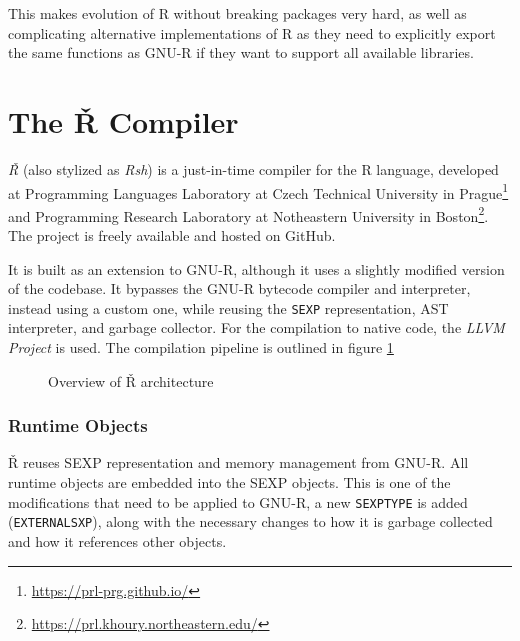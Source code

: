 This makes evolution of R without breaking packages very hard, as well as complicating alternative implementations of R as they need to explicitly export the same functions as GNU-R if they want to support all available libraries.

\newpage
\section{The Ř Compiler}

\textit{Ř} (also stylized as \textit{Rsh}) is a just-in-time compiler for the R language, developed at Programming Languages Laboratory at Czech Technical University in Prague\footnote{\url{https://prl-prg.github.io/}} and Programming Research Laboratory at Notheastern University in Boston\footnote{\url{https://prl.khoury.northeastern.edu/}}. The project is freely available and hosted on GitHub\cite{rsh-github}.

It is built as an extension to GNU-R, although it uses a slightly modified version of the codebase. It bypasses the GNU-R bytecode compiler and interpreter, instead using a custom one, while reusing the \texttt{SEXP} representation, AST interpreter, and garbage collector. For the compilation to native code, the \textit{LLVM Project}\cite{llvm} is used. The compilation pipeline is outlined in figure \ref{fig:rsh-archit}

\begin{figure}
	\centering
	\caption{Overview of Ř architecture\cite{reusing-jit}}\label{fig:rsh-archit}
\end{figure}

\subsubsection*{Runtime Objects}
Ř reuses SEXP representation and memory management from GNU-R. All runtime objects are embedded into the SEXP objects. This is one of the modifications that need to be applied to GNU-R, a new \texttt{SEXPTYPE} is added (\texttt{EXTERNALSXP}), along with the necessary changes to how it is garbage collected and how it references other objects.

